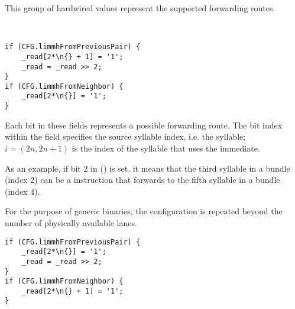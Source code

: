 

This group of hardwired values represent the supported  forwarding
routes.

\  %

\reset{****************}
\implementation{}
\begin{lstlisting}
if (CFG.limmhFromPreviousPair) {
    _read[2*\n{} + 1] = '1';
    _read = _read >> 2;
}
if (CFG.limmhFromNeighbor) {
    _read[2*\n{}] = '1';
}
\end{lstlisting}


Each bit in these fields represents a possible  forwarding route. 
The bit index within the field specifies the source syllable index, i.e. the 
 syllable; $i = \left ( 2n, 2n+1 \right )$ is the index of the 
syllable that uses the immediate.

As an example, if bit 2 in  () is set, it means that 
the third syllable in a bundle (index 2) can be a  instruction that 
forwards to the fifth syllable in a bundle (index 4).

For the purpose of generic binaries, the configuration is repeated beyond the
number of physically available lanes.

\reset{****************}
\implementation{}
\begin{lstlisting}
if (CFG.limmhFromPreviousPair) {
    _read[2*\n{}] = '1';
    _read = _read >> 2;
}
if (CFG.limmhFromNeighbor) {
    _read[2*\n{} + 1] = '1';
}
\end{lstlisting}


